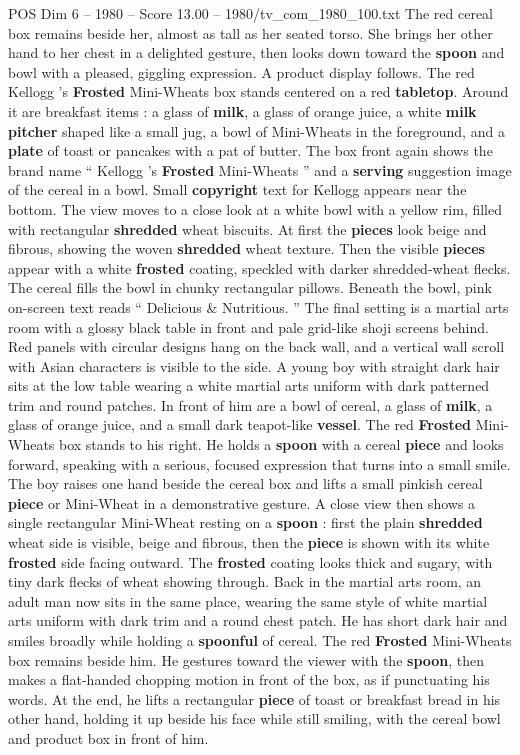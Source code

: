 \begin{textsample}{POS Dim 6 – 1980 – Score 13.00 – 1980/tv\_com\_1980\_100.txt}
The red cereal box remains beside her, almost as tall as her seated torso.
She brings her other hand to her chest in a delighted gesture, then looks down toward the \textbf{spoon} and bowl with a pleased, giggling expression.
A product display follows.
The red Kellogg ’s \textbf{Frosted} Mini-Wheats box stands centered on a red \textbf{tabletop}.
Around it are breakfast items : a glass of \textbf{milk}, a glass of orange juice, a white \textbf{milk} \textbf{pitcher} shaped like a small jug, a bowl of Mini-Wheats in the foreground, and a \textbf{plate} of toast or pancakes with a pat of butter.
The box front again shows the brand name “ Kellogg ’s \textbf{Frosted} Mini-Wheats ” and a \textbf{serving} suggestion image of the cereal in a bowl.
Small \textbf{copyright} text for Kellogg appears near the bottom.
The view moves to a close look at a white bowl with a yellow rim, filled with rectangular \textbf{shredded} wheat biscuits.
At first the \textbf{pieces} look beige and fibrous, showing the woven \textbf{shredded} wheat texture.
Then the visible \textbf{pieces} appear with a white \textbf{frosted} coating, speckled with darker shredded-wheat flecks.
The cereal fills the bowl in chunky rectangular pillows.
Beneath the bowl, pink on-screen text reads “ Delicious \& Nutritious. ” The final setting is a martial arts room with a glossy black table in front and pale grid-like shoji screens behind.
Red panels with circular designs hang on the back wall, and a vertical wall scroll with Asian characters is visible to the side.
A young boy with straight dark hair sits at the low table wearing a white martial arts uniform with dark patterned trim and round patches.
In front of him are a bowl of cereal, a glass of \textbf{milk}, a glass of orange juice, and a small dark teapot-like \textbf{vessel}.
The red \textbf{Frosted} Mini-Wheats box stands to his right.
He holds a \textbf{spoon} with a cereal \textbf{piece} and looks forward, speaking with a serious, focused expression that turns into a small smile.
The boy raises one hand beside the cereal box and lifts a small pinkish cereal \textbf{piece} or Mini-Wheat in a demonstrative gesture.
A close view then shows a single rectangular Mini-Wheat resting on a \textbf{spoon} : first the plain \textbf{shredded} wheat side is visible, beige and fibrous, then the \textbf{piece} is shown with its white \textbf{frosted} side facing outward.
The \textbf{frosted} coating looks thick and sugary, with tiny dark flecks of wheat showing through.
Back in the martial arts room, an adult man now sits in the same place, wearing the same style of white martial arts uniform with dark trim and a round chest patch.
He has short dark hair and smiles broadly while holding a \textbf{spoonful} of cereal.
The red \textbf{Frosted} Mini-Wheats box remains beside him.
He gestures toward the viewer with the \textbf{spoon}, then makes a flat-handed chopping motion in front of the box, as if punctuating his words.
At the end, he lifts a rectangular \textbf{piece} of toast or breakfast bread in his other hand, holding it up beside his face while still smiling, with the cereal bowl and product box in front of him.


\end{textsample}
